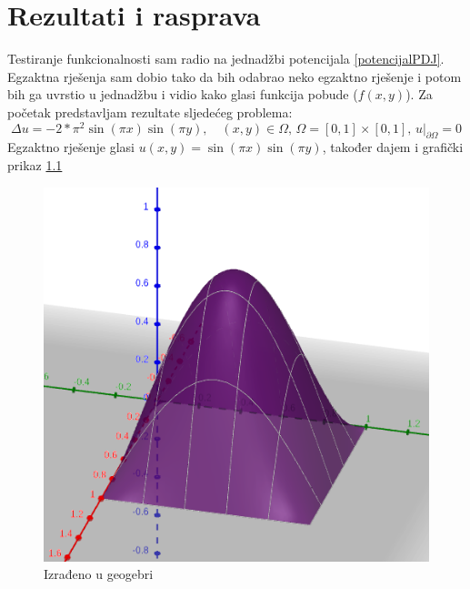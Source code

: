\documentclass[zavrsnirad]{../fer}
\begin{document}
\chapter{Rezultati i rasprava}
\label{pog:rezultati_i_rasprava}
Testiranje funkcionalnosti sam radio na jednadžbi 
potencijala \ref{potencijalPDJ}. 
Egzaktna rješenja sam dobio tako da bih odabrao neko egzaktno rješenje i 
potom bih ga uvrstio u jednadžbu i vidio kako glasi funkcija pobude ($f(x,y)$).
Za početak predstavljam rezultate sljedećeg problema:
\begin{equation}
  \Delta u = - 2 * \pi^2 \sin{(\pi x)}\sin{(\pi y)}, \quad (x,y) \in \Omega,
  \, \Omega = [0,1] \times [0,1], \, u |_{ \partial \Omega} = 0
\end{equation}
Egzaktno rješenje glasi $u(x,y) = \sin{(\pi x)}\sin{(\pi y)}$, također 
dajem i grafički prikaz \ref{sinsinEgz}
\bigskip
\begin{figure}[H]
	\centering
	\includegraphics[width=0.75\linewidth]{Figures/sinsinEgz.png}
	\caption{Izrađeno u geogebri}
  \label{sinsinEgz}
\end{figure}
\end{document}
